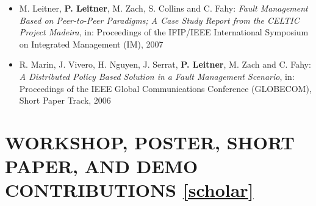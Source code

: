 \documentclass[paper=letter,fontsize=11pt]{scrartcl} %
\newcommand{\NewPart}[2]{\section*{\uppercase{#1} #2}}
\begin{document}
\begin{itemize}
\item M. Leitner, \textbf{P. Leitner}, M. Zach, S. Collins and C. Fahy: \emph{Fault
Management Based on Peer-to-Peer Paradigms; A Case Study Report from the CELTIC
Project Madeira}, in: Proceedings of the IFIP/IEEE International Symposium on Integrated
Management (IM), 2007
\item R. Marin, J. Vivero, H. Nguyen, J. Serrat, \textbf{P. Leitner}, M. Zach and C. Fahy: \emph{A Distributed Policy Based Solution in a Fault Management Scenario}, in: Proceedings of the IEEE Global Communications Conference (GLOBECOM), Short Paper Track, 2006
\end{itemize}

\NewPart{Workshop, Poster, Short Paper, and Demo Contributions}{\href{https://scholar.google.ch/citations?user=wZ9f8CAAAAAJ}{[scholar]}}
\end{document}
